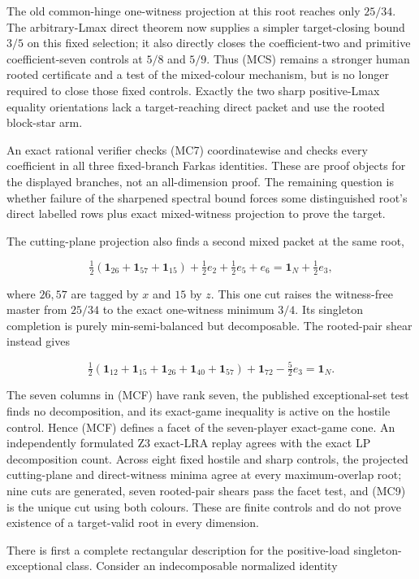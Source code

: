 \documentclass[11pt]{article}
\newcommand{\one}{\mathbf 1}
\begin{document}
The old common-hinge one-witness projection at this root reaches only
$25/34$.  The arbitrary-Lmax direct theorem now supplies a simpler
target-closing bound $3/5$ on this fixed selection; it also directly closes
the coefficient-two and primitive coefficient-seven controls at $5/8$ and
$5/9$.  Thus (MCS) remains a stronger human rooted certificate and a test of
the mixed-colour mechanism, but is no longer required to close those fixed
controls.  Exactly the two sharp positive-Lmax equality orientations lack a
target-reaching direct packet and use the rooted block-star arm.

An exact rational verifier checks (MC7) coordinatewise and checks every
coefficient in all three fixed-branch Farkas identities.  These are proof
objects for the displayed branches, not an all-dimension proof.  The
remaining question is whether failure of the sharpened spectral bound forces
some distinguished root's direct labelled rows plus exact mixed-witness
projection to prove the target.

The cutting-plane projection also finds a second mixed packet at the same
root,

\[
 \tfrac12(\one_{26}+\one_{57}+\one_{15})
 +\tfrac12e_2+\tfrac12e_5+e_6=\one_N+\tfrac12e_3,     \tag{MC9}
\]

where $26,57$ are tagged by $x$ and $15$ by $z$.  This one cut raises the
witness-free master from $25/34$ to the exact one-witness minimum $3/4$.
Its singleton completion is purely min-semi-balanced but decomposable.  The
rooted-pair shear instead gives

\[
 \tfrac12(\one_{12}+\one_{15}+\one_{26}+\one_{40}+\one_{57})
 +\one_{72}-\tfrac52e_3=\one_N.                      \tag{MCF}
\]

The seven columns in (MCF) have rank seven, the published exceptional-set
test finds no decomposition, and its exact-game inequality is active on the
hostile control.  Hence (MCF) defines a facet of the seven-player exact-game
cone.  An independently formulated Z3 exact-LRA replay agrees with the exact
LP decomposition count.  Across eight fixed hostile and sharp controls, the
projected cutting-plane and direct-witness minima agree at every
maximum-overlap root; nine cuts are generated, seven rooted-pair shears pass
the facet test, and (MC9) is the unique cut using both colours.  These are
finite controls and do not prove existence of a target-valid root in every
dimension.

There is first a complete rectangular description for the positive-load
singleton-exceptional class.  Consider an indecomposable normalized identity
\end{document}
